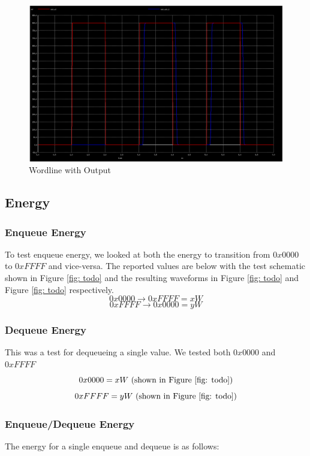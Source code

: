 \documentclass[a4paper]{article}
\begin{document}
\begin{figure}[H]
	\centering
	\includegraphics[scale=0.2]{exampleBitlineIOTiming}
	\caption{Wordline with Output}
	\label{fig:ioTiming}
\end{figure}



\subsection{Energy}
\subsubsection{Enqueue Energy}
To test enqueue energy, we looked at both the energy to transition from $0x0000$ to $0xFFFF$ and vice-versa. The reported values are below with the test schematic shown in Figure \ref{fig: todo} and the resulting waveforms in Figure \ref{fig: todo} and Figure \ref{fig: todo} respectively.
$$0x0000 \rightarrow 0xFFFF = xW$$
$$0xFFFF \rightarrow 0x0000 = yW$$
\subsubsection{Dequeue Energy}
This was a test for dequeueing a single value. We tested both $0x0000$ and $0xFFFF$
$$0x0000 = xW\textnormal{ (shown in Figure \ref{fig: todo})}$$
$$0xFFFF = yW\textnormal{ (shown in Figure \ref{fig: todo})}$$

\subsubsection{Enqueue/Dequeue Energy}
The energy for a single enqueue and dequeue is as follows:

\end{document}
